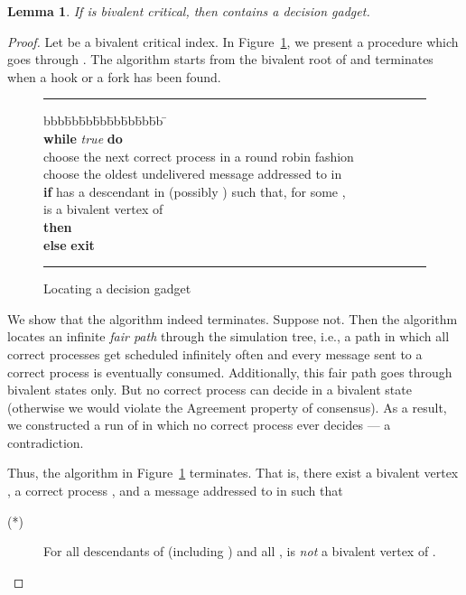 \documentclass[11pt]{article}
\newtheorem{lemma}{Lemma}
\newcommand{\id}[1]{\mbox{\textit{#1}}}\newcommand{\res}[1]{\mbox{\textbf{#1}}}
\begin{document}
\begin{lemma}
\label{lemma:cht-bivalent}
If  is bivalent critical, then  contains a decision gadget.
\end{lemma}
\begin{proof}
Let  be a bivalent critical index.
In Figure~\ref{fig:CHT-gadget}, we present a procedure
	which goes through .
The algorithm starts from the bivalent root of  and
	terminates when a hook or a fork has been found.

\begin{figure}[htbp]
\hrule \vspace{2mm} {\small
\begin{tabbing}
 bbb\=bb\=bb\=bb\=bb\=bb\=bb\=bb \=  \kill
    \> \\
    \> \res{while} \id{true} \res{do}\\
    \>\> choose the next correct process in a round robin fashion\\
    \>\> choose the oldest undelivered message addressed to  in \\
    \>\> \res{if}  has a descendant  in  (possibly ) such that,
		for some ,\\
    \>\>\>\>  is a bivalent vertex of  \\
    \>\> \res{then} \\
    \>\> \res{else} \res{exit}
 \end{tabbing}
\hrule }
  \caption{Locating a decision gadget}
  \label{fig:CHT-gadget}
\end{figure}

We show that the algorithm indeed terminates.
Suppose not.
Then the algorithm locates an infinite \emph{fair path} through the
	simulation tree, i.e., a path in which all correct processes get
	scheduled infinitely often and every message sent to a correct
	process is eventually consumed.
Additionally, this fair path goes through bivalent states only.
But no correct process can decide in a bivalent state 
	(otherwise we would violate the Agreement property of consensus).
As a result, we constructed a run of  in which no correct process ever decides
	--- a contradiction.

Thus, the algorithm in Figure~\ref{fig:CHT-gadget} terminates.
That is, there exist a bivalent vertex , a correct process ,
	and a message  addressed to  in  such that
	
\begin{description}
\item[(*)] For all descendants  of  (including )
	and all ,  is \emph{not}
	a bivalent vertex of .
\end{description}


\end{proof}
\end{document}
